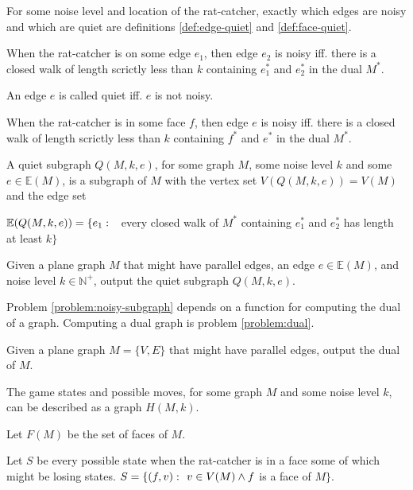 \documentclass{article}
\begin{document}
		For some noise level and location of the rat-catcher, exactly which edges are noisy and which are quiet are definitions \ref{def:edge-quiet} and \ref{def:face-quiet}.

		\begin{definition}\label{def:edge-quiet}
			When the rat-catcher is on some edge $e_1$, then edge $e_2$ is noisy iff. there is a closed walk of length scrictly less than $k$ containing $e_1^*$ and $e_2^*$ in the dual $M^*$.
		\end{definition}

		An edge $e$ is called quiet iff. $e$ is not noisy.

		\begin{definition}\label{def:face-quiet}
			When the rat-catcher is in some face $f$, then edge $e$ is noisy iff. there is a closed walk of length scrictly less than $k$ containing $f^*$ and $e^*$ in the dual $M^*$.
		\end{definition}

		A quiet subgraph $Q(M, k, e)$, for some graph $M$, some noise level $k$ and some $e \in \mathbb{E}(M)$, is a subgraph of $M$ with the vertex set $V(Q(M, k, e)) = V(M)$ and the edge set

		$\mathbb{E}(Q(M, k, e)) = \{e_1 \,\colon\  $ every closed walk of $M^*$ containing $e_1^*$ and $e_2^*$ has length at least $k\}$

		\begin{problem}\label{problem:noisy-subgraph}
			Given a plane graph $M$ that might have parallel edges, an edge $e \in \mathbb{E}(M)$, and noise level $k \in \mathbb{N}^+$, output the quiet subgraph $Q(M, k, e)$.
		\end{problem}

		Problem \ref{problem:noisy-subgraph} depends on a function for computing the dual of a graph. Computing a dual graph is problem \ref{problem:dual}.

		\begin{problem}\label{problem:dual}
			Given a plane graph $M = \{V, E\}$ that might have parallel edges, output the dual of $M$.
		\end{problem}

		The game states and possible moves, for some graph $M$ and some noise level $k$, can be described as a graph $H(M, k)$.

		Let $F(M)$ be the set of faces of $M$.

		Let $S$ be every possible state when the rat-catcher is in a face some of which might be losing states. $S = \{ (f, v) \,\colon\  v \in V(M) \land f$ is a face of $ M \}$.
\end{document}
